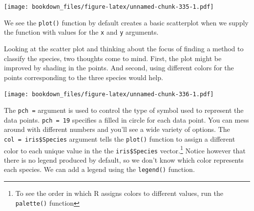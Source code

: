 \documentclass[
]{krantz}
\makeatletter
\newenvironment{Shaded}{\begin{snugshade}}{\end{snugshade}}
\newcommand{\DataTypeTok}[1]{\textcolor[rgb]{0.27,0.27,0.27}{#1}}
\newcommand{\DecValTok}[1]{\textcolor[rgb]{0.06,0.06,0.06}{#1}}
\newcommand{\FloatTok}[1]{\textcolor[rgb]{0.06,0.06,0.06}{#1}}
\newcommand{\KeywordTok}[1]{\textcolor[rgb]{0.27,0.27,0.27}{\textbf{#1}}}
\newcommand{\NormalTok}[1]{#1}
\newcommand{\OperatorTok}[1]{\textcolor[rgb]{0.43,0.43,0.43}{\textbf{#1}}}
\newcommand{\StringTok}[1]{\textcolor[rgb]{0.5,0.5,0.5}{#1}}
\newenvironment{kframe}{%
\medskip{}
\setlength{\fboxsep}{.8em}
 \def\at@end@of@kframe{}%
 \ifinner\ifhmode%
  \def\at@end@of@kframe{\end{minipage}}%
  \begin{minipage}{\columnwidth}%
 \fi\fi%
 \def\FrameCommand##1{\hskip\@totalleftmargin \hskip-\fboxsep
 \colorbox{shadecolor}{##1}\hskip-\fboxsep
     \hskip-\linewidth \hskip-\@totalleftmargin \hskip\columnwidth}%
 \MakeFramed {\advance\hsize-\width
   \@totalleftmargin\z@ \linewidth\hsize
   \@setminipage}}%
 {\par\unskip\endMakeFramed%
 \at@end@of@kframe}
\renewenvironment{Shaded}{\begin{kframe}}{\end{kframe}}
\makeatother
\begin{document}
\texttt{[image: bookdown\_files/figure-latex/unnamed-chunk-335-1.pdf]}

We see the \texttt{plot()} function by default creates a basic scatterplot when we supply the function with values for the \texttt{x} and \texttt{y} arguments.

Looking at the scatter plot and thinking about the focus of finding a method to classify the species, two thoughts come to mind. First, the plot might be improved by shading in the points. And second, using different colors for the points corresponding to the three species would help.

\begin{Shaded}
\end{Shaded}

\texttt{[image: bookdown\_files/figure-latex/unnamed-chunk-336-1.pdf]}

The \texttt{pch\ =} argument is used to control the type of symbol used to represent the data points. \texttt{pch\ =\ 19} specifies a filled in circle for each data point. You can mess around with different numbers and you'll see a wide variety of options. The \texttt{col\ =\ iris\$Species} argument tells the \texttt{plot()} function to assign a different color to each unique value in the the \texttt{iris\$Species} vector.\footnote{To see the order in which R assigns colors to different values, run the \texttt{palette()} function} Notice however that there is no legend produced by default, so we don't know which color represents each species. We can add a legend using the \texttt{legend()} function.

\begin{Shaded}
\end{Shaded}
\end{document}
